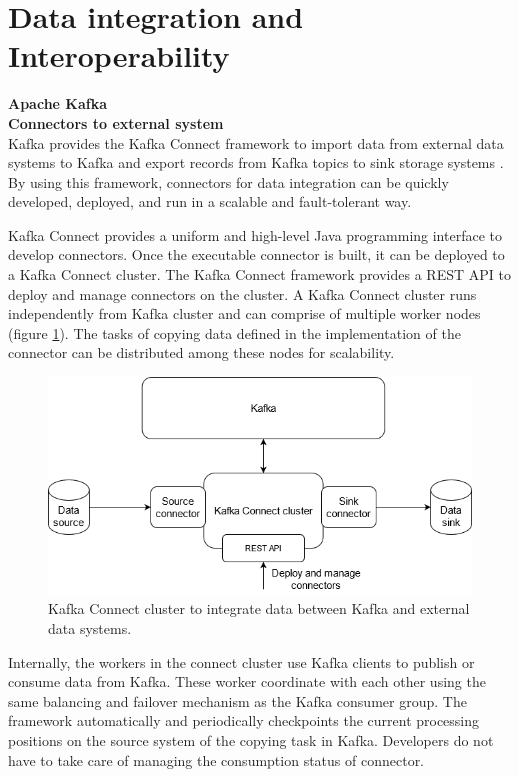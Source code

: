 \section{Data integration and Interoperability}
\large \textbf{Apache Kafka}\\
\normalsize
\textbf{Connectors to external system}\\
Kafka provides the Kafka Connect framework to import data from external data systems to Kafka and export records from Kafka topics to sink storage systems \cite{kafkaconnect}. By using this framework, connectors for data integration can be quickly developed, deployed, and run in a scalable and fault-tolerant way. 

Kafka Connect provides a uniform and high-level Java programming interface to develop connectors. Once the executable connector is built, it can be deployed to a Kafka Connect cluster. The Kafka Connect framework provides a REST API to deploy and manage connectors on the cluster. A Kafka Connect cluster runs independently from Kafka cluster and can comprise of multiple worker nodes (figure \ref{fig:connectkafka}). The tasks of copying data defined in the implementation of the connector can be distributed among these nodes for scalability. 

\begin{figure}[h]
	\centering
	\includegraphics[width=12cm]{images/connector-kafka.png}
	\caption{Kafka Connect cluster to integrate data between Kafka and external data systems.}
	\label{fig:connectkafka}
\end{figure}

Internally, the workers in the connect cluster use Kafka clients to publish or consume data from Kafka. These worker coordinate with each other using the same balancing and failover mechanism as the Kafka consumer group. The framework automatically and periodically checkpoints the current processing positions on the source system of the copying task in Kafka. Developers do not have to take care of managing the consumption status of connector.

